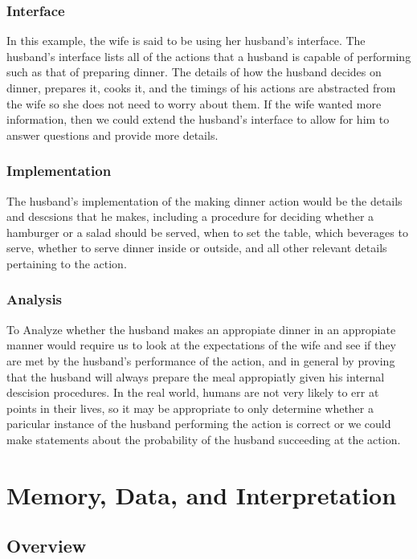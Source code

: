 \documentclass[12pt, letterpaper]{book}
\begin{document}
	\subsection{Interface}

		In this example, the wife is said to be using her husband's interface. The husband's interface lists all of the actions that a husband is capable of performing such as that of preparing dinner. The details of how the husband decides on dinner, prepares it, cooks it, and the timings of his actions are abstracted from the wife so she does not need to worry about them. If the wife wanted more information, then we could extend the husband's interface to allow for him to answer questions and provide more details.

	\subsection{Implementation}

	The husband's implementation of the making dinner action would be the details and descsions that he makes, including a procedure for deciding whether a hamburger or a salad should be served, when to set the table, which beverages to serve, whether to serve dinner inside or outside, and all other relevant details pertaining to the action.

	\subsection{Analysis}

	To Analyze whether the husband makes an appropiate dinner in an appropiate manner would require us to look at the expectations of the wife and see if they are met by the husband's performance of the action, and in general by proving that the husband will always prepare the meal appropiatly given his internal descision procedures. In the real world, humans are not very likely to err at points in their lives, so it may be appropriate to only determine whether a paricular instance of the husband performing the action is correct or we could make statements about the probability of the husband succeeding at the action.


\chapter{Memory, Data, and Interpretation} \label{memory}

	\section{Overview}
\end{document}
